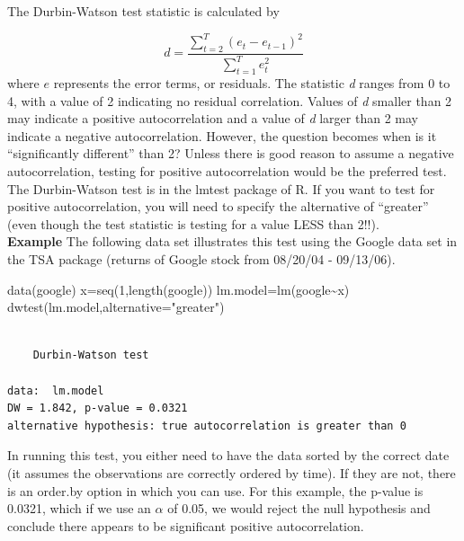\documentclass[
  letterpaper,
  DIV=11,
  numbers=noendperiod]{scrreprt}
\newenvironment{Shaded}{\begin{snugshade}}{\end{snugshade}}
\newcommand{\AttributeTok}[1]{\textcolor[rgb]{0.40,0.45,0.13}{#1}}
\newcommand{\DecValTok}[1]{\textcolor[rgb]{0.68,0.00,0.00}{#1}}
\newcommand{\FunctionTok}[1]{\textcolor[rgb]{0.28,0.35,0.67}{#1}}
\newcommand{\NormalTok}[1]{\textcolor[rgb]{0.00,0.23,0.31}{#1}}
\newcommand{\OtherTok}[1]{\textcolor[rgb]{0.00,0.23,0.31}{#1}}
\newcommand{\SpecialCharTok}[1]{\textcolor[rgb]{0.37,0.37,0.37}{#1}}
\newcommand{\StringTok}[1]{\textcolor[rgb]{0.13,0.47,0.30}{#1}}
\begin{document}
The Durbin-Watson test statistic is calculated by

\[ d=\frac{\sum_{t=2}^T(e_{t}-e_{t-1})^2}{\sum_{t=1}^T e_{t}^2}\] where
\(e\) represents the error terms, or residuals. The statistic \emph{d}
ranges from 0 to 4, with a value of 2 indicating no residual
correlation. Values of \emph{d} smaller than 2 may indicate a positive
autocorrelation and a value of \emph{d} larger than 2 may indicate a
negative autocorrelation. However, the question becomes when is it
``significantly different'' than 2? Unless there is good reason to
assume a negative autocorrelation, testing for positive autocorrelation
would be the preferred test. The Durbin-Watson test is in the lmtest
package of R. If you want to test for positive autocorrelation, you will
need to specify the alternative of ``greater'' (even though the test
statistic is testing for a value LESS than 2!!).\\

\textbf{Example} The following data set illustrates this test using the
Google data set in the TSA package (returns of Google stock from
08/20/04 - 09/13/06).

\begin{Shaded}
\begin{Highlighting}[]
\FunctionTok{data}\NormalTok{(google)}
\NormalTok{x}\OtherTok{=}\FunctionTok{seq}\NormalTok{(}\DecValTok{1}\NormalTok{,}\FunctionTok{length}\NormalTok{(google))}
\NormalTok{lm.model}\OtherTok{=}\FunctionTok{lm}\NormalTok{(google}\SpecialCharTok{\textasciitilde{}}\NormalTok{x)}
\FunctionTok{dwtest}\NormalTok{(lm.model,}\AttributeTok{alternative=}\StringTok{"greater"}\NormalTok{)}
\end{Highlighting}
\end{Shaded}

\begin{verbatim}

    Durbin-Watson test

data:  lm.model
DW = 1.842, p-value = 0.0321
alternative hypothesis: true autocorrelation is greater than 0
\end{verbatim}

In running this test, you either need to have the data sorted by the
correct date (it assumes the observations are correctly ordered by
time). If they are not, there is an order.by option in which you can
use. For this example, the p-value is 0.0321, which if we use an
\(\alpha\) of 0.05, we would reject the null hypothesis and conclude
there appears to be significant positive autocorrelation.
\end{document}
